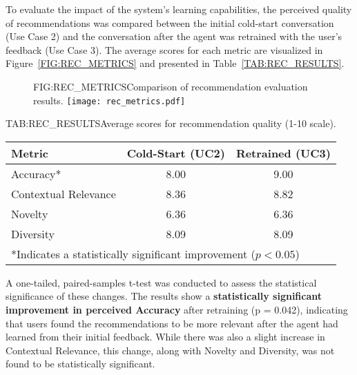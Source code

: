 To evaluate the impact of the system's learning capabilities, the perceived quality of recommendations was compared between the initial cold-start conversation (Use Case 2) and the conversation after the agent was retrained with the user's feedback (Use Case 3). The average scores for each metric are visualized in Figure~\ref{FIG:REC_METRICS} and presented in Table~\ref{TAB:REC_RESULTS}.

\begin{figure}[Recommendation Metrics]{FIG:REC_METRICS}{Comparison of recommendation evaluation results.}
    \texttt{[image: rec\_metrics.pdf]}
\end{figure}

\begin{table}[Recommendation Quality Scores]{TAB:REC_RESULTS}{Average scores for recommendation quality (1-10 scale).}
    \begin{tabular}{l c c}
        \hline
        \textbf{Metric} & \textbf{Cold-Start (UC2)} & \textbf{Retrained (UC3)} \\
        \hline
        Accuracy* & 8.00 & 9.00 \\
        Contextual Relevance & 8.36 & 8.82 \\
        Novelty & 6.36 & 6.36 \\
        Diversity & 8.09 & 8.09 \\
        \hline
        \multicolumn{3}{l}{\footnotesize{*Indicates a statistically significant improvement ($p < 0.05$)}}
    \end{tabular}
\end{table}

A one-tailed, paired-samples t-test was conducted to assess the statistical significance of these changes. The results show a \textbf{statistically significant improvement in perceived Accuracy} after retraining (p = 0.042), indicating that users found the recommendations to be more relevant after the agent had learned from their initial feedback. While there was also a slight increase in Contextual Relevance, this change, along with Novelty and Diversity, was not found to be statistically significant.